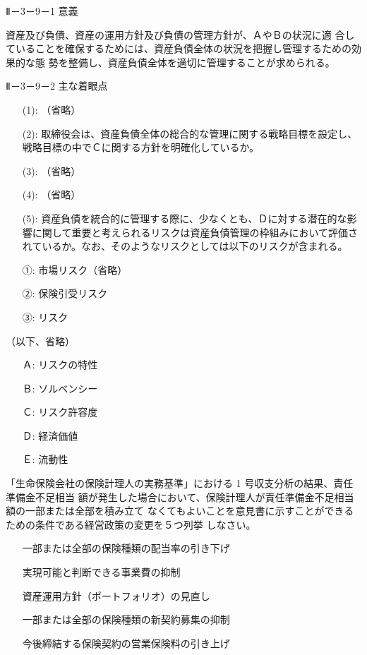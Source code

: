 \documentclass[report,gutter=10mm,fore-edge=10mm,uplatex,dvipdfmx]{jlreq}
\begin{document}
Ⅱ－3－9－1 意義

資産及び負債、資産の運用方針及び負債の管理方針が、ＡやＢの状況に適
合していることを確保するためには、資産負債全体の状況を把握し管理するための効果的な態
勢を整備し、資産負債全体を適切に管理することが求められる。

Ⅱ－3－9－2 主な着眼点

\begin{itemize}
 \item[(1): ]  （省略）
 \item[(2): ]  取締役会は、資産負債全体の総合的な管理に関する戦略目標を設定し、戦略目標の中でＣに関する方針を明確化しているか。
 \item[(3): ]  （省略）
 \item[(4): ]  （省略）
 \item[(5): ]  資産負債を統合的に管理する際に、少なくとも、Ｄに対する潜在的な影響に関して重要と考えられるリスクは資産負債管理の枠組みにおいて評価されているか。なお、そのようなリスクとしては以下のリスクが含まれる。
 \item[①: ] 市場リスク（省略）
 \item[②: ] 保険引受リスク
 \item[③: ] リスク
\end{itemize}

（以下、省略）
\answer{}
\begin{itemize}
\item[ Ａ: ] リスクの特性
\item[ Ｂ: ] ソルベンシー
\item[ Ｃ: ] リスク許容度
\item[ Ｄ: ] 経済価値
\item[ Ｅ: ] 流動性
\end{itemize}

「生命保険会社の保険計理人の実務基準」における 1 号収支分析の結果、責任準備金不足相当
額が発生した場合において、保険計理人が責任準備金不足相当額の一部または全部を積み立て
なくてもよいことを意見書に示すことができるための条件である経営政策の変更を５つ列挙
しなさい。

\answer{}
\begin{itemize}
\item[]  一部または全部の保険種類の配当率の引き下げ
\item[]  実現可能と判断できる事業費の抑制
\item[]  資産運用方針（ポートフォリオ）の見直し
\item[]  一部または全部の保険種類の新契約募集の抑制
\item[]  今後締結する保険契約の営業保険料の引き上げ
\end{itemize}
\end{document}
